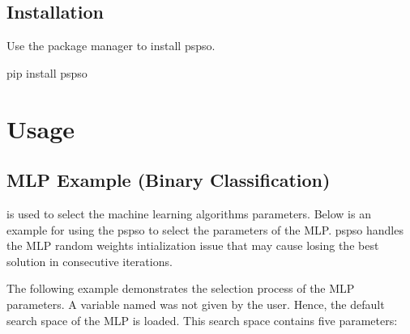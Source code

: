 \documentclass[letterpaper,10pt,english]{sphinxmanual}
\begin{document}
\section{Installation}
\label{\detokenize{index:installation}}
Use the package manager  to
install pspso.

\begin{sphinxVerbatim}[commandchars=\\\{\}]
pip install pspso
\end{sphinxVerbatim}


\chapter{Usage}
\label{\detokenize{index:usage}}

\section{MLP Example (Binary Classification)}
\label{\detokenize{index:mlp-example-binary-classification}}
 is used to select the machine learning algorithms parameters.
Below is an example for using the pspso to select
the parameters of the MLP. pspso handles the
MLP random weights intialization issue that may cause losing the best
solution in consecutive iterations.

The following example demonstrates the selection process of the MLP parameters.
A variable named  was not given by the user. Hence, the default search space of the MLP is loaded.
This search space contains five parameters:
\end{document}
